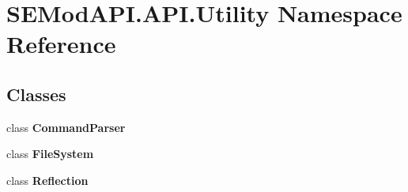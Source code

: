 \hypertarget{namespace_s_e_mod_a_p_i_1_1_a_p_i_1_1_utility}{}\section{S\+E\+Mod\+A\+P\+I.\+A\+P\+I.\+Utility Namespace Reference}
\label{namespace_s_e_mod_a_p_i_1_1_a_p_i_1_1_utility}
\subsection*{Classes}
\begin{DoxyCompactItemize}
\item 
class {\bfseries Command\+Parser}
\item 
class {\bfseries File\+System}
\item 
class {\bfseries Reflection}
\end{DoxyCompactItemize}
